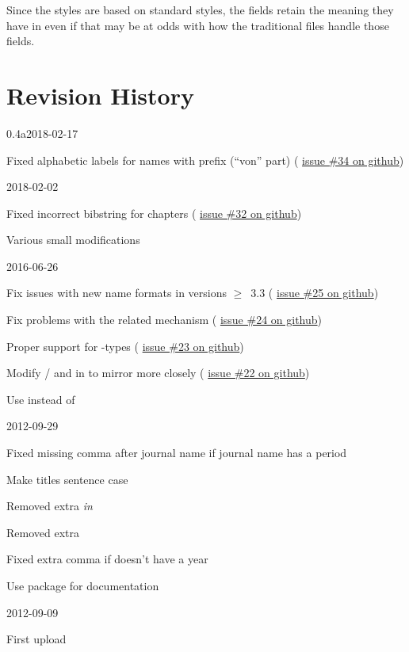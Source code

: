 \documentclass{ltxdockit}[2011/03/25]
\newcommand*{\gitissuelink}[1]{%
  \href{https://github.com/moewew/biblatex-trad/issues/#1}{issue \##1 on github}}
\begin{document}
Since the styles are based on  standard styles, the fields retain the meaning
they have in  even if that may be at odds with how the traditional 
files handle those fields.


\section{Revision History}\label{apx:log}
\begin{changelog}
\begin{release}{0.4a}{2018-02-17}
\item Fixed alphabetic labels for names with prefix (\enquote{von} part) (\gitissuelink{34})
\end{release}

\begin{release}{0.4}{2018-02-02}
\item Fixed incorrect bibstring for chapters (\gitissuelink{32})
\item Various small modifications
\end{release}

\begin{release}{0.3}{2016-06-26}
\item Fix issues with new name formats in  versions $\geq$~3.3 (\gitissuelink{25})
\item Fix problems with the related mechanism (\gitissuelink{24})
\item Proper support for -types (\gitissuelink{23})
\item Modify / and  in  to mirror  more closely (\gitissuelink{22})
\item Use  instead of 
\end{release}

\begin{release}{0.2}{2012-09-29}
\item Fixed missing comma after journal name if journal name has a period
\item Make titles sentence case
\item Removed extra \emph{in}
\item Removed extra 
\item Fixed extra comma if  doesn't have a year
\item Use package  for documentation
\end{release}

\begin{release}{0.1}{2012-09-09}
\item First upload
\end{release}
\end{changelog}
\end{document}
